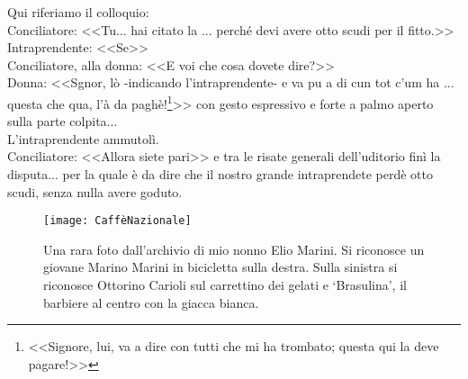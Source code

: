 \indent Qui riferiamo il colloquio:\\
\indent Conciliatore: <<Tu... hai citato la .\:.\:. perché devi avere otto scudi per il fitto.>>\\
\indent Intraprendente: <<Se>>\\
\indent Conciliatore, alla donna: <<E voi che cosa dovete dire?>>\\
\indent Donna: <<Sgnor, lò -indicando l'intraprendente- e va pu a di cun tot c'um ha .\:.\:. questa che qua, l'à da paghè!\footnote{<<Signore, lui, va a dire con tutti che mi ha trombato; questa qui la deve pagare!>>}>> con gesto espressivo e forte a palmo aperto sulla parte colpita...\\
\indent L'intraprendente ammutolì.\\
\indent Conciliatore: <<Allora siete pari>> e tra le risate generali dell'uditorio finì la disputa... per la quale è da dire che il nostro grande intraprendete perdè otto scudi, senza nulla avere goduto. 



\newpage

 \begin{figure}[htb]
    \centering
    \vspace{-0.3cm}
    \texttt{[image: CaffèNazionale]}
    \caption[Alfonsinesi davanti al Caffè Nazionale]{Una rara foto dall'archivio di mio nonno Elio Marini. Si riconosce un giovane Marino Marini in bicicletta sulla destra. Sulla sinistra si riconosce Ottorino Carioli sul carrettino dei gelati e `Brasulina', il barbiere al centro con la giacca bianca.\label{fig:CaffèNazionale}}
    \vspace{-0.3cm}
\end{figure}